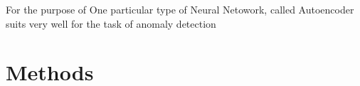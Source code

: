 \documentclass{article}
\begin{document}
For the purpose of 
One particular type of Neural Netowork, called Autoencoder suits very well
for the task of anomaly detection 



\section{Methods}


\newpage
 

\end{document}
